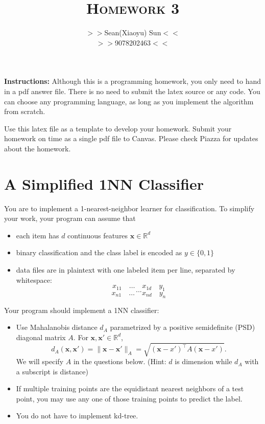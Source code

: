\documentclass[a4paper]{article}
\title{\textsc{Homework 3}} %
\author{
$>>$Sean(Xiaoyu) Sun$<<$ \\
$>>$9078202463$<<$\\
}
\date{}
\theoremstyle{definition}
\newcommand{\RR}{\mathbb{R}}
\def\x{\mathbf x}
\begin{document}
\maketitle 


\textbf{Instructions:} 
Although this is a programming homework, you only need to hand in a pdf answer file.
There is no need to submit the latex source or any code.
You can choose any programming language, as long as you implement the algorithm from scratch. 

Use this latex file as a template to develop your homework.
Submit your homework on time as a single pdf file to Canvas.
Please check Piazza for updates about the homework.

\section{A Simplified 1NN Classifier}
You are to implement a 1-nearest-neighbor learner for classification.
To simplify your work, your program can assume that
\begin{itemize}
\item each item has $d$ continuous features $\x \in \RR^d$
\item binary classification and the class label is encoded as $y \in \{0,1\}$
\item data files are in plaintext with one labeled item per line, separated by whitespace:
$$x_{11} \quad \ldots \quad x_{1d} \quad y_1$$
$$...$$
$$x_{n1} \quad \ldots \quad x_{nd} \quad y_n$$
\end{itemize}

Your program should implement a 1NN classifier: 
\begin{itemize}
\item Use Mahalanobis distance $d_A$ parametrized by a positive semidefinite (PSD) diagonal matrix $A$.  For $\x, \x' \in \RR^d$,
$$d_A(\x,\x') = \|\x-\x'\|_A = \sqrt{(\x-x')^\top A (\x-x')}.$$
We will specify $A$ in the questions below. (Hint: $d$ is dimension while $d_A$ with a subscript is distance)
\item If multiple training points are the equidistant nearest neighbors of a test point, you may use any one of those training points to predict the label.
\item You do not have to implement kd-tree.
\end{itemize}
\end{document}
